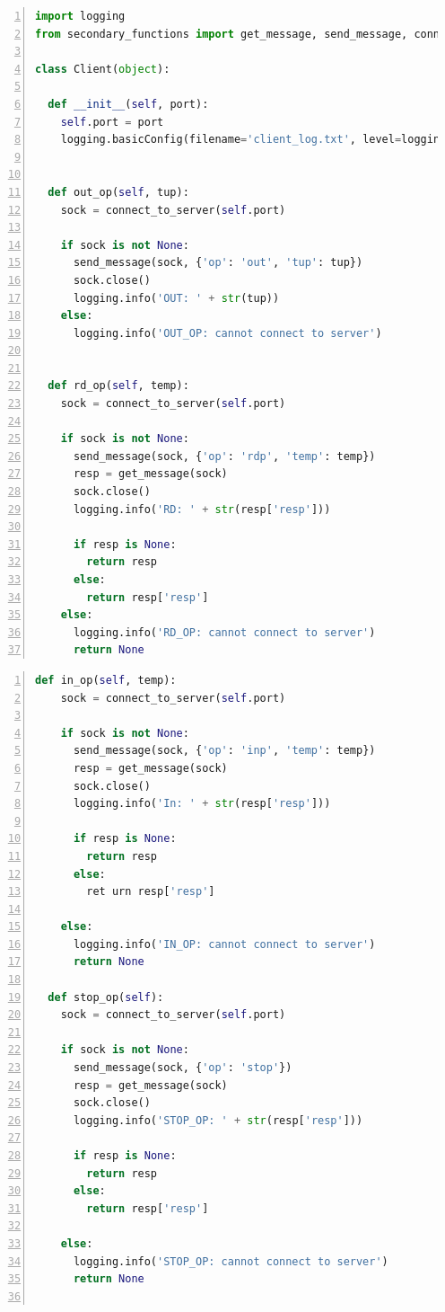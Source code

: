 \begin{ListingEnv}[p]\caption{Класс $Client$, модуль $client$}\label{list:client}
\begin{lstlisting}[language=Python, numbers=left]
import logging
from secondary_functions import get_message, send_message, connect_to_server

class Client(object):

  def __init__(self, port):
	self.port = port
	logging.basicConfig(filename='client_log.txt', level=logging.DEBUG, format="%(asctime)s - %(message)s")


  def out_op(self, tup):
	sock = connect_to_server(self.port)

	if sock is not None:
	  send_message(sock, {'op': 'out', 'tup': tup})
	  sock.close()
	  logging.info('OUT: ' + str(tup))
	else:
	  logging.info('OUT_OP: cannot connect to server')

	
  def rd_op(self, temp):
	sock = connect_to_server(self.port)

	if sock is not None:
	  send_message(sock, {'op': 'rdp', 'temp': temp})
	  resp = get_message(sock)
	  sock.close()
	  logging.info('RD: ' + str(resp['resp']))

	  if resp is None:
		return resp
	  else:
		return resp['resp']
	else:
	  logging.info('RD_OP: cannot connect to server')
	  return None

\end{lstlisting}
\end{ListingEnv}
\begin{ListingEnv}[p]\caption{Класс $Client$, модуль $client$ (продолжение)}\label{list:client2}
	\begin{lstlisting}[language=Python, numbers=left]
  def in_op(self, temp):
	sock = connect_to_server(self.port)

	if sock is not None:
	  send_message(sock, {'op': 'inp', 'temp': temp})
	  resp = get_message(sock)
	  sock.close()
	  logging.info('In: ' + str(resp['resp']))

	  if resp is None:
		return resp
	  else:
		ret	urn resp['resp']

	else:
	  logging.info('IN_OP: cannot connect to server')
	  return None
	
  def stop_op(self):
	sock = connect_to_server(self.port)

	if sock is not None:
	  send_message(sock, {'op': 'stop'})
	  resp = get_message(sock)
	  sock.close()
	  logging.info('STOP_OP: ' + str(resp['resp']))

	  if resp is None:
		return resp
	  else:
		return resp['resp']

	else:
	  logging.info('STOP_OP: cannot connect to server')
	  return None
	
	\end{lstlisting}
\end{ListingEnv}


